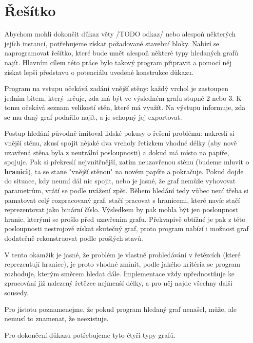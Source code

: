 
\chapter{Řešítko}
Abychom mohli dokončit důkaz věty /TODO odkaz/ nebo alespoň některých jejích instancí, potřebujeme získat požadované stavební bloky. Nabízí se naprogramovat řešítko, které bude umět alespoň některé typy hledaných grafů najít. Hlavním cílem této práce bylo takový program připravit a pomocí něj získat lepší představu o potenciálu uvedené konstrukce důkazu.

Program na vstupu očekává zadání vnější stěny: každý vrchol je zastoupen jedním bitem, který určuje, zda má být ve výsledném grafu stupně 2 nebo 3. K tomu očekává seznam velikostí stěn, které má využít. Na výstupu informuje, zda se mu daný graf podařilo najít, a je schopný jej exportovat.

Postup hledání původně imitoval lidské pokusy o řešení problému: nakreslí si vnější stěnu, zkusí spojit nějaké dva vrcholy řetízkem vhodné délky (aby nově uzavřená stěna byla z neutrální posloupnosti) a dokud má místo na papíře, spojuje. Pak si překreslí nejvnitřnější, zatím neuzavřenou stěnu (budeme mluvit o \textbf{hranici}), ta se stane "vnější stěnou" na novém papíře a pokračuje. Pokud dojde do situace, kdy neumí dál nic spojit, nebo je jasné, že graf nemůže vyhovovat parametrům, vrátí se podle uvážení zpět. Během hledání tedy vůbec není třeba si pamatovat celý rozpracovaný graf, stačí pracovat s hranicemi, které navíc stačí reprezentovat jako binární číslo. Výsledkem by pak mohla být jen posloupnost hranic, kterými se prošlo před uzavřením grafu. Překvapivě obtížné je pak z této posloupnosti nestrojově získat skutečný graf, proto program nabízí i možnost graf dodatečně rekonstruovat podle prošlých stavů.

V tento okamžik je jasné, že problém je vlastně prohledávání v řetězcích (které reprezentují hranice), je proto vhodné zmínit, podle jakého kritéria se program rozhoduje, kterým směrem hledat dále. Implementace vždy upřednostňuje ke zpracování již nalezený řetězec nejmenší délky, a pro něj najde všechny další sousedy.

Pro jistotu poznamenejme, že pokud program hledaný graf nenašel, může, ale nemusí to znamenat, že neexistuje.

Pro dokončení důkazu potřebujeme tyto čtyři typy grafů.

